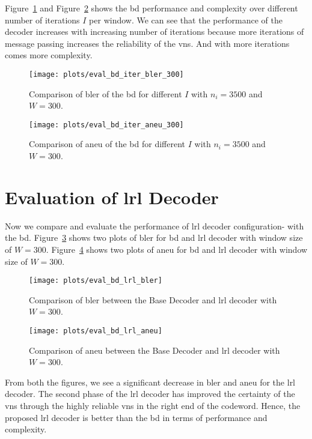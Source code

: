 Figure~\ref{fig:eval_bd_iter_bler_300} and Figure~\ref{fig:eval_bd_iter_aneu_300} shows the \gls{bd} performance and complexity over different number of iterations $I$ per window. We can see that the performance of the decoder increases with increasing number of iterations because more iterations of message passing increases the reliability of the \glspl{vn}. And with more iterations comes more complexity.
\begin{figure}[htbp]
  \centering
  \texttt{[image: plots/eval\_bd\_iter\_bler\_300]}
  \caption{Comparison of \gls{bler} of the \acrfull{bd} for different $I$ with $n_i=3500$ and $W=300$.}
  \label{fig:eval_bd_iter_bler_300}
\end{figure}
\begin{figure}[htbp]
  \centering
  \texttt{[image: plots/eval\_bd\_iter\_aneu\_300]}
  \caption{Comparison of \gls{aneu} of the \acrfull{bd} for different $I$ with $n_i=3500$ and $W=300$.}
  \label{fig:eval_bd_iter_aneu_300}
\end{figure}

\section{Evaluation of \acrlong{lrl} Decoder}
Now we compare and evaluate the performance of \gls{lrl} decoder configuration- with the \gls{bd}. Figure~\ref{fig:eval_bd_lrl_bler} shows two plots of \gls{bler} for \gls{bd} and \gls{lrl} decoder with window size of $W=300$. Figure~\ref{fig:eval_bd_lrl_aneu} shows two plots of \gls{aneu} for \gls{bd} and \gls{lrl} decoder with window size of $W=300$.
\begin{figure}[htbp]
  \centering
  \texttt{[image: plots/eval\_bd\_lrl\_bler]}
  \caption{Comparison of \gls{bler} between the Base Decoder and \gls{lrl} decoder with $W=300$.}
  \label{fig:eval_bd_lrl_bler}
\end{figure}
\begin{figure}[htbp]
  \centering
  \texttt{[image: plots/eval\_bd\_lrl\_aneu]}
  \caption{Comparison of \gls{aneu} between the Base Decoder and \gls{lrl} decoder with $W=300$.}
  \label{fig:eval_bd_lrl_aneu}
\end{figure}

From both the figures, we see a significant decrease in \gls{bler} and \gls{aneu} for the \gls{lrl} decoder. The second phase of the \gls{lrl} decoder has improved the certainty of the \glspl{vn} through the highly reliable \glspl{vn} in the right end of the codeword. Hence, the proposed \gls{lrl} decoder is better than the \gls{bd} in terms of performance and complexity.

